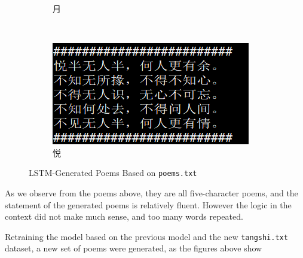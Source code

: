 \documentclass[10pt]{article}
\begin{document}
\begin{figure}[H]
\begin{subfigure}[t]{0.23\textwidth}
\caption{月}
\label{poems_7}
\end{subfigure}
~
\begin{subfigure}[t]{0.23\textwidth}
\centering
\includegraphics[scale=.65]{poems_8.png}
\caption{悦}
\label{poems_8}
\end{subfigure}
\caption{LSTM-Generated Poems Based on \texttt{poems.txt}}
\end{figure}
As we observe from the poems above, they are all five-character poems, and the statement of the generated poems is relatively fluent. However the logic in the context did not make much sense, and too many words repeated.\par
Retraining the model based on the previous model and the new \texttt{tangshi.txt} dataset, a new set of poems were generated, as the figures above show
\end{document}
